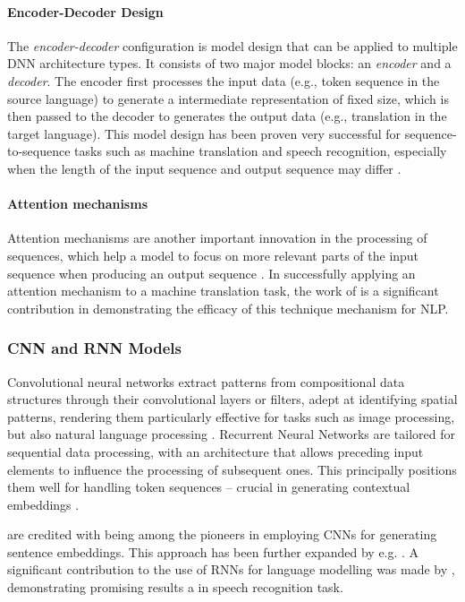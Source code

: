 \documentclass[11pt]{scrreprt}
\let\citef\cite  %
\let\cite\parencite  %
\begin{document}
\paragraph{Encoder-Decoder Design}
The \textit{encoder-decoder} configuration is model design that can be applied to multiple DNN architecture types. It consists of two major model blocks: an \textit{encoder} and a \textit{decoder}. The encoder first processes the input data (e.g., token sequence in the source language) to generate a  intermediate representation of fixed size, which is then passed to the decoder to generates the output data (e.g., translation in the target language). This model design has been proven very successful for sequence-to-sequence tasks such as machine translation and speech recognition, especially when the length of the input sequence and output sequence may differ \cite{choPropertiesNeuralMachine2014}.

\paragraph{Attention mechanisms}
Attention mechanisms are another important innovation in the processing of sequences, which help a model to focus on more relevant parts of the input sequence when producing an output sequence \cite{galassiAttentionNaturalLanguage2021}. In successfully applying an attention mechanism to a machine translation task, the work of \citef{bahdanauNeuralMachineTranslation2016}  is a significant contribution in demonstrating the efficacy of this technique mechanism for NLP.


\subsubsection{CNN and RNN Models}
Convolutional neural networks extract patterns from compositional data structures through their convolutional layers or filters, adept at identifying spatial patterns, rendering them particularly effective for tasks such as image processing, but also natural language processing \cite{albawiUnderstandingConvolutionalNeural2017}. Recurrent Neural Networks are tailored for sequential data processing, with an architecture that allows preceding input elements to influence the processing of subsequent ones. This principally positions them well for handling token sequences -- crucial in generating contextual embeddings \cite{yuReviewRecurrentNeural2019}.

\citef{collobertUnifiedArchitectureNatural2008} are credited with being among the pioneers in employing CNNs for generating sentence embeddings. This approach has been further expanded by e.g.  \citef{kalchbrennerConvolutionalNeuralNetwork2014}. A significant contribution to the use of RNNs for language modelling was made by \citef{mikolovRecurrentNeuralNetwork2010}, demonstrating promising results a in speech recognition task.
\end{document}
